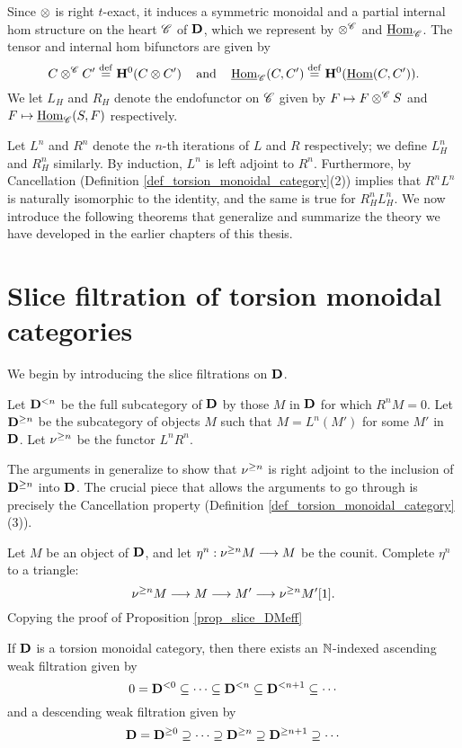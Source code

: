 Since $\otimes$ is right $t$-exact, it induces a symmetric 
monoidal and a partial internal hom structure on the heart 
$\mathscr{C}$ of $\mathbf{D}$, which we represent by $\otimes^{\mathscr{C}}$ 
and $\underline{\mathrm{Hom}}_{\mathscr{C}}$. The tensor and internal hom bifunctors
are given by
\[
C \otimes^{\mathscr{C}} C' \stackrel{\mathrm{def}}{=} \mathbf{H}^0(C \otimes C') 
   \;\;\;\textrm{ and }\;\;\;
\underline{\mathrm{Hom}}_{\mathscr{C}}(C, C') \stackrel{\mathrm{def}}{=} \mathbf{H}^0(\underline{\mathrm{Hom}}(C, C')).
\]
We let $L_H$ and $R_H$ denote the endofunctor on 
$\mathscr{C}$ given by $F \mapsto F \otimes^{\mathscr{C}} S$ and $F \mapsto
\underline{\mathrm{Hom}}_{\mathscr{C}}(S, F)$ respectively.

Let $L^n$ and $R^n$ denote the $n$-th iterations of $L$ and $R$ 
respectively; we define $L_H^n$ and $R_H^n$ similarly. By induction,
$L^n$ is left adjoint to $R^n$. Furthermore, by Cancellation 
(Definition \ref{def_torsion_monoidal_category}(2)) implies that 
$R^nL^n$ is naturally isomorphic to the identity, and the same is 
true for $R_H^nL_H^n$. We now introduce the following theorems 
that generalize and summarize the theory we have developed in the
earlier chapters of this thesis.

\section{Slice filtration of torsion monoidal categories}
\label{sect_summary_slice_filt_on_DCat}

We begin by introducing the slice filtrations on $\mathbf{D}$. 

\begin{def}
Let $\mathbf{D}^{< n}$ be the full subcategory of $\mathbf{D}$ by those 
$M$ in $\mathbf{D}$ for which $R^n M = 0$. Let $\mathbf{D}^{\geq n}$ be 
the subcategory of objects $M$ such that $M = L^n(M')$ for some 
$M'$ in $\mathbf{D}$. Let $\nu^{\geq n}$ be the functor  $L^nR^n$.
\end{def}

The arguments in \cite[1.1]{HuKa} generalize to show that 
$\nu^{\geq n}$ is right adjoint to the inclusion of 
$\mathbf{D}^{\geq n}$ into $\mathbf{D}$. The crucial piece that
allows the arguments to go through is precisely the Cancellation
property (Definition \ref{def_torsion_monoidal_category} (3)).

Let $M$ be an object of $\mathbf{D}$, and let $\eta^n : \nu^{\geq n} M 
\longrightarrow M$ be the counit. Complete $\eta^n$ to a triangle:
\[
\nu^{\geq n} M \longrightarrow M \longrightarrow M' \longrightarrow \nu^{\geq n} M'[1].
\]
Copying the proof of Proposition \ref{prop_slice_DMeff}

\begin{thm}\label{thm_summary_triang_cat}
If $\mathbf{D}$ is a torsion monoidal category, then there exists
an $\mathbb{N}$-indexed ascending weak filtration given by
\[
0 = \mathbf{D}^{< 0} \subseteq \cdots \subseteq \mathbf{D}^{< n}
   \subseteq \mathbf{D}^{< n + 1} \subseteq \cdots
\]
and a descending weak filtration given by
\[
\mathbf{D} = \mathbf{D}^{\geq 0} \supseteq \cdots \supseteq \mathbf{D}^{\geq n}
\supseteq \mathbf{D}^{\geq n + 1} \supseteq \cdots
\]
\end{thm}

